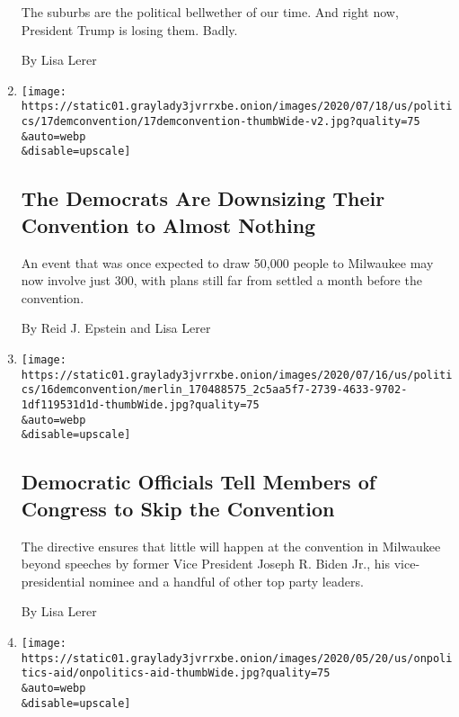 \begin{enumerate}
  The suburbs are the political bellwether of our time. And right now,
  President Trump is losing them. Badly.

  By Lisa Lerer
\item
  \href{/2020/07/17/us/politics/democratic-convention-milwaukee.html}{}

  \texttt{[image: https://static01.graylady3jvrrxbe.onion/images/2020/07/18/us/politics/17demconvention/17demconvention-thumbWide-v2.jpg?quality=75\\\&auto=webp\\\&disable=upscale]}

  \hypertarget{the-democrats-are-downsizing-their-convention-to-almost-nothing}{%
  \subsection{The Democrats Are Downsizing Their Convention to Almost
  Nothing}\label{the-democrats-are-downsizing-their-convention-to-almost-nothing}}

  An event that was once expected to draw 50,000 people to Milwaukee may
  now involve just 300, with plans still far from settled a month before
  the convention.

  By Reid J. Epstein and Lisa Lerer
\item
  \href{/2020/07/16/us/politics/democratic-convention-milwaukee.html}{}

  \texttt{[image: https://static01.graylady3jvrrxbe.onion/images/2020/07/16/us/politics/16demconvention/merlin\_170488575\_2c5aa5f7-2739-4633-9702-1df119531d1d-thumbWide.jpg?quality=75\\\&auto=webp\\\&disable=upscale]}

  \hypertarget{democratic-officials-tell-members-of-congress-to-skip-the-convention}{%
  \subsection{Democratic Officials Tell Members of Congress to Skip the
  Convention}\label{democratic-officials-tell-members-of-congress-to-skip-the-convention}}

  The directive ensures that little will happen at the convention in
  Milwaukee beyond speeches by former Vice President Joseph R. Biden
  Jr., his vice-presidential nominee and a handful of other top party
  leaders.

  By Lisa Lerer
\item
  \href{/2020/07/16/us/politics/reopening-schools-teachers-students.html}{}

  \texttt{[image: https://static01.graylady3jvrrxbe.onion/images/2020/05/20/us/onpolitics-aid/onpolitics-aid-thumbWide.jpg?quality=75\\\&auto=webp\\\&disable=upscale]}


\end{enumerate}
